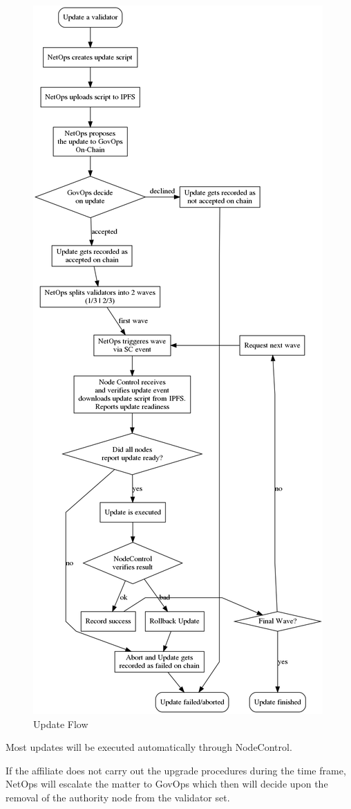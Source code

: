 \begin{figure}[ht]
	\centering
    \includegraphics[width=\textwidth,height=\textheight,keepaspectratio]{./images/flow-update-validator.png}
	\caption{Update Flow}
	\label{fig:updateflow}
\end{figure}

Most updates will be executed automatically through NodeControl.

If the affiliate does not carry out the upgrade procedures during the time frame, NetOps will escalate the matter to GovOps which then will decide upon the removal of the authority node from the validator set.
